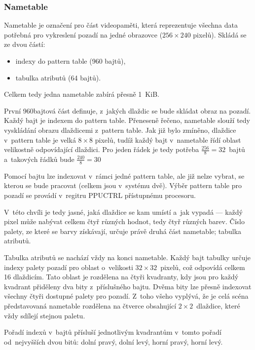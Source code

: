 \subsubsection{Nametable}
Nametable je označení pro část videopaměti, která reprezentuje všechna data potřebná pro vykreslení pozadí na jedné obrazovce ($256 \times 240$ pixelů). Skládá se ze dvou částí:

\begin{itemize}
	\item indexy do pattern table (960 bajtů),
	\item tabulka atributů (64 bajtů).
\end{itemize}

Celkem tedy jedna nametable zabírá přesně 1~KiB.

První 960bajtová část definuje, z~jakých dlaždic se bude skládat obraz na pozadí. Každý bajt je indexem do pattern table. Přeneseně řečeno, nametable slouží tedy vyskládání obrazu dlaždicemi z~pattern table. Jak již bylo zmíněno, dlaždice v~pattern table je velká $8 \times 8$ pixelů, tudíž každý bajt v~nametable řídí oblast velikostně odpovídající dlaždici. Pro jeden řádek je tedy potřeba $\frac{256}{8} = 32$~bajtů a~takových řádků bude $\frac{240}{8} = 30$

\begin{note}
	Pomocí bajtu lze indexovat v~rámci jedné pattern table, ale již nelze vybrat, se kterou se bude pracovat (celkem jsou v~systému dvě). Výběr pattern table pro pozadí se provádí v~regitru PPUCTRL přístupnému procesoru.
\end{note}

V~této chvíli je tedy jasné, jaká dlaždice se kam umístí a~jak vypadá --- každý pixel může nabývat celkem čtyř různých hodnot, tedy čtyř různých barev. Číslo palety, ze které se barvy získávají, určuje právě druhá část nametable; tabulka atributů.

Tabulka atributů se nachází vždy na konci nametable. Každý bajt tabulky určuje indexy palety pozadí pro oblast o~velikosti $32 \times 32$~pixelů, což odpovídá celkem 16 dlaždicím. Tato oblast je rozdělena na čtyři kvadranty, kdy jsou pro každý kvadrant přiděleny dva bity z~příslušného bajtu. Dvěma bity lze přesně indexovat všechny čtyři dostupné palety pro pozadí. Z~toho všeho vyplývá, že je celá scéna představovaná nametable rozdělena na čtverce obsahující $2\times2$~dlaždice, které vždy sdílejí stejnou paletu.

Pořadí indexů v~bajtů přísluší jednotlivým kvadrantům v~tomto pořadí od~nejvyšších dvou bitů: dolní pravý, dolní levý, horní pravý, horní levý.

